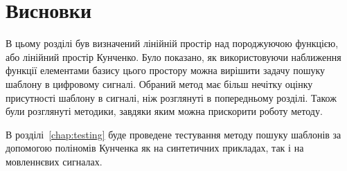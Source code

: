 \section{Висновки}
В цьому розділі був визначений лінійній простір над породжуючою функцією, або лінійний простір Кунченко.
Було показано, як використовуючи наближення функції елементами базису цього простору можна вирішити задачу пошуку
шаблону в цифровому сигналі.
Обраний метод має більш нечітку оцінку присутності шаблону в сигналі, ніж розглянуті в попередньому розділі.
Також були розглянуті методики, завдяки яким можна прискорити роботу методу.

В розділі~\ref{chap:testing} буде проведене тестування методу пошуку шаблонів за допомогою поліномів Кунченка як на
синтетичних прикладах, так і на мовленнєвих сигналах.

